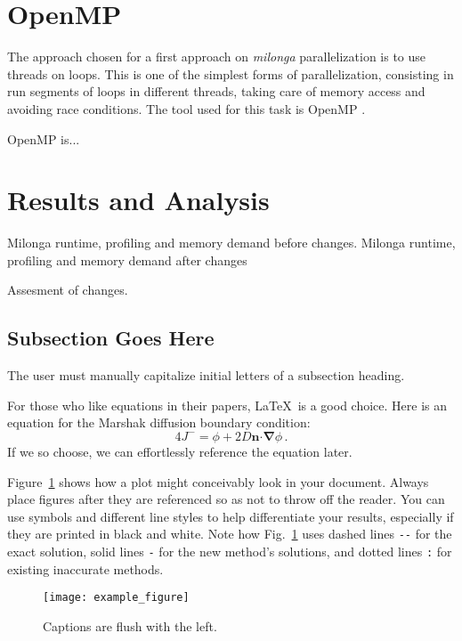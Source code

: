 \documentclass{anstrans}
\renewcommand{\vec}[1]{\bm{#1}} %
\newcommand{\vd}{\bm{\cdot}} %
\newcommand{\grad}{\vec{\nabla}} %
\begin{document}
\section{OpenMP}

The approach chosen for a first approach on \textit{milonga} parallelization
is to use threads on loops. This is one of the simplest forms of parallelization,
consisting in run segments of loops in different threads, taking care of memory
access and avoiding race conditions. The tool used for this task is OpenMP
\cite{Dagum1998}.

OpenMP is...



\section{Results and Analysis}

Milonga runtime, profiling and memory demand before changes.
Milonga runtime, profiling and memory demand after changes

Assesment of changes.

\subsection{Subsection Goes Here}
The user must manually capitalize initial letters of a subsection heading.

For those who like equations in their papers, \LaTeX\ is a good choice. Here is
an equation for the Marshak diffusion boundary condition:
\begin{equation} \label{eq:marshak}
  4 J^- = \phi + 2 D \vec{n} \vd \grad \phi \,.
\end{equation}
If we so choose, we can effortlessly reference the equation later.

Figure~\ref{fig:voltage} shows how a plot might conceivably look in your
document. Always place figures after they are referenced so as not to throw
off the reader. You can use symbols and different line styles to help
differentiate your results, especially if they are printed in black and white.
Note how Fig.~\ref{fig:voltage} uses dashed lines \verb|--| for the exact
solution, solid lines \verb|-| for the new method's solutions, and dotted lines
\verb|:| for existing inaccurate methods.
\begin{figure}[ht] %
  \centering
  \texttt{[image: example\_figure]}
  \caption{Captions are flush with the left.}
  \label{fig:voltage}
\end{figure}
\end{document}
